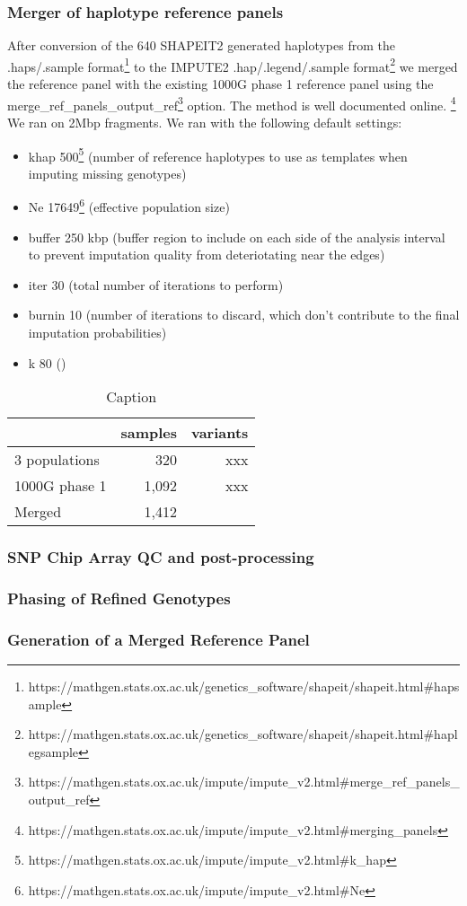 \subsubsection{Merger of haplotype reference panels}
After conversion of the 640 SHAPEIT2 generated haplotypes from the .haps/.sample format\footnote{https://mathgen.stats.ox.ac.uk/genetics\_software/shapeit/shapeit.html\#hapsample} to the IMPUTE2 .hap/.legend/.sample format\footnote{https://mathgen.stats.ox.ac.uk/genetics\_software/shapeit/shapeit.html\#haplegsample} we merged the reference panel with the existing \gls{1000G} phase 1 reference panel using the \-merge\_ref\_panels\_output\_ref\footnote{https://mathgen.stats.ox.ac.uk/impute/impute\_v2.html\#\-merge\_ref\_panels\_output\_ref} option.
The method is well documented online.
\footnote{https://mathgen.stats.ox.ac.uk/impute/impute\_v2.html\#merging\_panels}
We ran on 2\gls{Mbp} fragments. We ran with the following default settings:
\begin{itemize}
\item \-khap 500\footnote{https://mathgen.stats.ox.ac.uk/impute/impute\_v2.html\#\-k\_hap} (number of reference haplotypes to use as templates when imputing missing genotypes)
\item \-Ne 17649\footnote{https://mathgen.stats.ox.ac.uk/impute/impute\_v2.html\#\-Ne} (effective population size\cite{Wright01031931}\cite{Wright1938})
\item \-buffer 250 \gls{kbp} (buffer region to include on each side of the analysis interval to prevent imputation quality from deteriotating near the edges)
\item \-iter 30 (total number of iterations to perform)
\item \-burnin 10 (number of iterations to discard, which don't contribute to the final imputation probabilities)
\item \-k 80 ()
\end{itemize}

\begin{table}[]
\centering
\begin{tabular}{l|r|r}
 & samples & variants \\ \hline
 3 populations & 320 & xxx \\
 1000G phase 1 & 1,092 & xxx \\
 Merged & 1,412 &  \
\end{tabular}
\caption{Caption}
\label{tab:my_label}
\end{table}

\subsubsection{SNP Chip Array QC and post-processing}
\subsubsection{Phasing of Refined Genotypes}
\subsubsection{Generation of a Merged Reference Panel}
